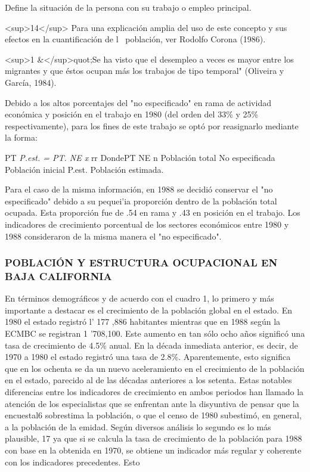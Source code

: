 \documentclass{article}
\begin{document}
Define la situación de la persona con su trabajo o empleo principal.

<sup>14</sup> Para una explicación amplia del uso de este concepto y sus efectos en la cuantificación de l~ población, ver Rodolfo Corona (1986).

<sup>1 \&</sup>quot;Se ha visto que el desempleo a veces es mayor entre los migrantes y que éstos ocupan más los trabajos de tipo temporal" (Oliveira y García, 1984).

Debido a los altos porcentajes del "no especificado" en rama de actividad económica y posición en el trabajo en 1980 (del orden del 33\% y 25\% respectivamente), para los fines de este trabajo se optó por reasignarlo mediante la forma:

PT \textit{P.est. = PT. NE x} rr DondePT NE n Población total No especificada Población inicial P.est. Población estimada.

Para el caso de la misma información, en 1988 se decidió conservar el "no especificado" debido a su pequei'ia proporción dentro de la población total ocupada. Esta proporción fue de .54 en rama y .43 en posición en el trabajo. Los indicadores de crecimiento porcentual de los sectores económicos entre 1980 y 1988 consideraron de la misma manera el "no especificado".

\subsubsection{POBLACIÓN Y ESTRUCTURA OCUPACIONAL EN BAJA CALIFORNIA}

En términos demográficos y de acuerdo con el cuadro 1, lo primero y más importante a destacar es el crecimiento de la población global en el estado. En 1980 el estado registró l' 177 ,886 habitantes mientras que en 1988 según la ECMBC se registran 1 '708,100. Este aumento en tan sólo ocho años significó una tasa de crecimiento de 4.5\% anual. En la década inmediata anterior, es decir, de 1970 a 1980 el estado registró una tasa de 2.8\%. Aparentemente, esto significa que en los ochenta se da un nuevo aceleramiento en el crecimiento de la población en el estado, parecido al de las décadas anteriores a los setenta. Estas notables diferencias entre los indicadores de crecimiento en ambos periodos han llamado la atención de los especialistas que se enfrentan ante la disyuntiva de pensar que la encuestal6 sobrestima la población, o que el censo de 1980 subestimó, en general, a la población de la emidad. Según diversos análisis lo segundo es lo más plausible, 17 ya que si se calcula la tasa de crecimiento de la población para 1988 con base en la obtenida en 1970, se obtiene un indicador más regular y coherente con los indicadores precedentes. Esto
\end{document}
